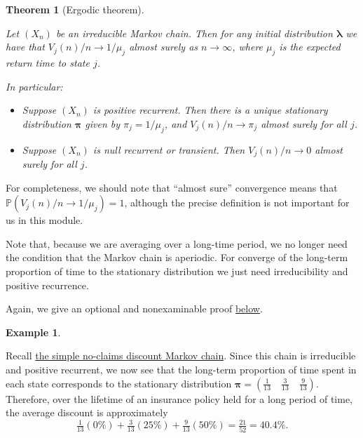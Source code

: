 \documentclass[
  a4paper,
]{article}
\providecommand{\tightlist}{%
  \setlength{\itemsep}{0pt}\setlength{\parskip}{0pt}}
\newtheorem{theorem}{Theorem}[section]
\theoremstyle{definition}
\theoremstyle{definition}
\newtheorem{example}{Example}[section]
\theoremstyle{definition}
\theoremstyle{remark}
\begin{document}
\begin{theorem}[Ergodic theorem]
\protect\hypertarget{thm:ergodic}{}\label{thm:ergodic}

Let \((X_n)\) be an irreducible Markov chain. Then for any initial distribution \(\boldsymbol\lambda\) we have that \(V_j(n)/n \to 1/\mu_j\) almost surely as \(n \to \infty\), where \(\mu_j\) is the expected return time to state \(j\).

In particular:

\begin{itemize}
\tightlist
\item
  Suppose \((X_n)\) is positive recurrent. Then there is a unique stationary distribution \(\boldsymbol\pi\) given by \(\pi_j = 1/\mu_j\), and \(V_j(n)/n \to \pi_j\) almost surely for all \(j\).
\item
  Suppose \((X_n)\) is null recurrent or transient. Then \(V_j(n)/n \to 0\) almost surely for all \(j\).
\end{itemize}

\end{theorem}

For completeness, we should note that ``almost sure'' convergence means that \(\mathbb P(V_j(n)/n \to 1/\mu_j) = 1\), although the precise definition is not important for us in this module.

Note that, because we are averaging over a long-time period, we no longer need the condition that the Markov chain is aperiodic. For converge of the long-term proportion of time to the stationary distribution we just need irreducibility and positive recurrence.

Again, we give an optional and nonexaminable proof \protect\hyperlink{S11-proofs}{below}.

\begin{example}
\protect\hypertarget{exm:ergodic-ex}{}\label{exm:ergodic-ex}

Recall \protect\hyperlink{S06-example1}{the simple no-claims discount Markov chain}. Since this chain is irreducible and positive recurrent, we now see that the long-term proportion of time spent in each state corresponds to the stationary distribution \(\boldsymbol\pi = (\frac1{13} \quad \frac{3}{13}\quad \frac9{13})\). Therefore, over the lifetime of an insurance policy held for a long period of time, the average discount is approximately
\[ \tfrac{1}{13}(0\%) + \tfrac{3}{13}(25\%) + \tfrac{9}{13}(50\%) = \tfrac{21}{52} = 40.4\% . \]

\end{example}
\end{document}
